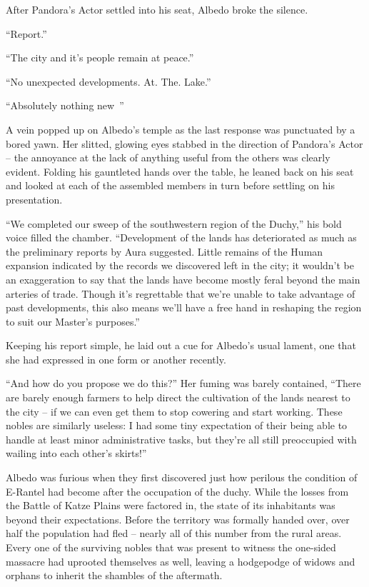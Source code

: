  

After Pandora’s Actor settled into his seat, Albedo broke the silence.

 

“Report.”

 

“The city and it’s people remain at peace.”

 

“No unexpected developments. At. The. Lake.”

 

“Absolutely nothing new~”

 

A vein popped up on Albedo's temple as the last response was punctuated by a bored yawn. Her slitted, glowing eyes stabbed in the direction of Pandora’s Actor – the annoyance at the lack of anything useful from the others was clearly evident. Folding his gauntleted hands over the table, he leaned back on his seat and looked at each of the assembled members in turn before settling on his presentation.

 

“We completed our sweep of the southwestern region of the Duchy,” his bold voice filled the chamber. “Development of the lands has deteriorated as much as the preliminary reports by Aura suggested. Little remains of the Human expansion indicated by the records we discovered left in the city; it wouldn’t be an exaggeration to say that the lands have become mostly feral beyond the main arteries of trade. Though it’s regrettable that we’re unable to take advantage of past developments, this also means we’ll have a free hand in reshaping the region to suit our Master’s purposes.”

 

Keeping his report simple, he laid out a cue for Albedo’s usual lament, one that she had expressed in one form or another recently.

 

“And how do you propose we do this?” Her fuming was barely contained, “There are barely enough farmers to help direct the cultivation of the lands nearest to the city – if we can even get them to stop cowering and start working. These nobles are similarly useless: I had some tiny expectation of their being able to handle at least minor administrative tasks, but they're all still preoccupied with wailing into each other’s skirts!”

 

Albedo was furious when they first discovered just how perilous the condition of E-Rantel had become after the occupation of the duchy. While the losses from the Battle of Katze Plains were factored in, the state of its inhabitants was beyond their expectations. Before the territory was formally handed over, over half the population had fled – nearly all of this number from the rural areas. Every one of the surviving nobles that was present to witness the one-sided massacre had uprooted themselves as well, leaving a hodgepodge of widows and orphans to inherit the shambles of the aftermath.

